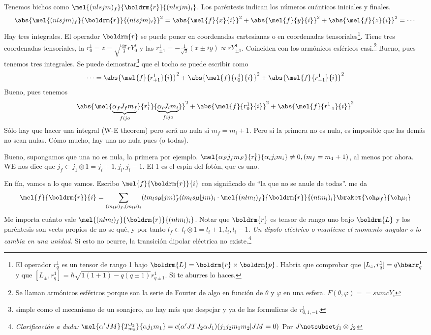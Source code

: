 Tenemos bichos como $\mel{(nlsjm)_f}{\boldrm{r}}{(nlsjm)_i}$. Los
paréntesis indican los números cuánticos iniciales y finales.
\begin{equation}
\abs{ \mel{(nlsjm)_f}{\boldrm{r}}{(nlsjm)_i} }^2 =
\abs{\mel{f}{x}{i}}^2 + \abs{\mel{f}{y}{i}}^2 + \abs{\mel{f}{z}{i}}^2
= \cdots
\end{equation}
Hay tres integrales. El operador $\boldrm{r}$ se puede poner en
coordenadas cartesianas o en coordenadas tensoriales\footnote{El
  operador $r_q^1$ es un tensor de rango 1 bajo
  $\boldrm{L}=\boldrm{r}\times \boldrm{p}$. Habría que comprobar que
  $[L_z,r_q^1]=q \hbarr_q^1$ y que $[L_\pm,r_q^1]= \hbar
  \sqrt{1(1+1)-q(q\pm1)} r_{q\pm1}^1$. Si te aburres lo haces.}. Tiene tres
coordenadas tensoriales, la $r_0^1=z = \sqrt{\frac{4\pi}{3}} r Y_0^1$ y las $r_{\pm 1}^1= -
\frac{1}{\sqrt{2}}(x\pm iy) \propto r Y_{\pm 1}^1 $. Coinciden con los armónicos esféricos
casi.\footnote{Se llaman armónicos esféricos porque son la serie de
  Fourier de algo en función de $\theta$ y $\varphi$ en una esfera. $F(\theta,\varphi)==sum c Y_i$}
Bueno, pues tenemos tres integrales. Se puede demostrar\footnote{simple como
el mecanismo de un sonajero,  no hay más que despejar y ya de las
formulicas de $r_{0,1,-1}^1$.} que el tocho se puede escribir como
\begin{equation}
\cdots =  \abs{\mel{f}{r_{+1}^1}{i}}^2 + \abs{\mel{f}{r_{0}^1}{i}}^2 + \abs{\mel{f}{r_{-1}^1}{i}}^2
\end{equation}
Bueno, pues tenemos
\begin{equation}
  \abs{\mel{\underbrace{\alpha_fJ_f m_f}_{fijo}}{r_1^1}{\underbrace{\alpha_i J_i m_i}_{fijo}}}^2 +
  \abs{\mel{f}{r_0^1}{i}}^2 +  \abs{\mel{f}{r_{-1}^1}{i}}^2
\end{equation}
Sólo hay que hacer una integral (W-E theorem) pero será no nula si
$m_f=m_i+1$. Pero si la primera no es nula, es imposible que las demás no
sean nulas. Cómo mucho, hay una no nula pues (o todas).

Bueno, supongamos que una no es nula, la primera por ejemplo.
$\mel{\alpha_F j_f m_F}{r_1^1}{\alpha_i j_i m_i} \neq 0 , (m_f=m_1+1)$, al menos
por ahora. WE nos dice que $j_f \subset j_1 \otimes 1 = j_i+1, j_i,
j_i -1$. El 1 es el espín del fotón, que es uno.

En fín, vamos a lo que vamos. Escribo $\mel{f}{\boldrm{r}}{i}$ con
significado de ``la que no se anule de todas''. me da
\begin{equation}
\mel{f}{\boldrm{r}}{i} = \sum_{(m_l \mu)_f, (m_l \mu)_i} (l m_l s \mu
| j m)_f^* (lm_l s\mu | jm)_i \cdot
\mel{(nlm_l)_f}{\boldrm{r}}{(nlm_l)_i} \braket{ \oh \mu_f}{\oh \mu_i}
\end{equation}
Me importa cuánto vale $\mel{(nlm_l)_f}{\boldrm{r}}{(nlm_l)_i} $.
Notar que $\boldrm{r}$ es tensor de rango uno bajo $\boldrm{L}$ y los
paréntesis son vects propios de no se qué, y por tanto $l_f \subset
l_i \otimes 1 = l_i+1,l_i,l_i-1$. \emph{Un dipolo eléctrico o mantiene el momento
angular o lo cambia en una unidad}. Si esto no ocurre, la transición
dipolar eléctrica no existe.\footnote{
\emph{Clarificación a duda:} $\mel{\alpha' J M}{T_{m_2}^{J_2}}{\alpha j_1 m_1} =
c (\alpha' J T J_2 \alpha J_1)(j_1 j_2 m_1 m_2|JM=0)$ Por $J \notsubset j_1 \otimes j_2$
}

